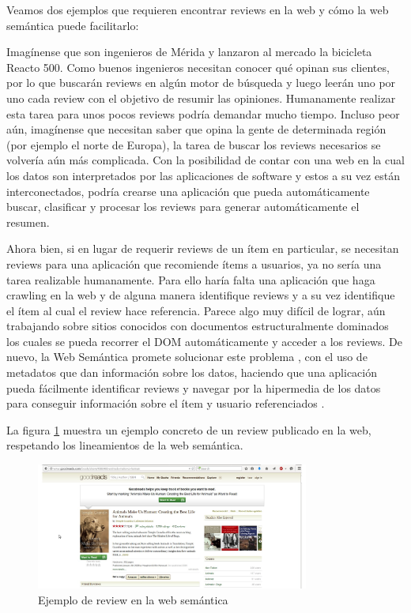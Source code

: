 Veamos dos ejemplos que requieren encontrar reviews en la web y cómo la web semántica puede facilitarlo:

Imagínense que son ingenieros de Mérida y lanzaron al mercado la bicicleta Reacto 500. Como buenos ingenieros necesitan conocer qué opinan sus clientes, por lo que buscarán reviews en algún motor de búsqueda y luego leerán uno por uno cada review con el objetivo de resumir las opiniones. Humanamente realizar esta tarea para unos pocos reviews podría demandar mucho tiempo. 
Incluso peor aún, imagínense que necesitan saber que opina la gente de determinada región (por ejemplo el norte de Europa), la tarea de buscar los reviews necesarios se volvería aún más complicada.
Con la posibilidad de contar con una web en la cual los datos son interpretados por las aplicaciones de software y estos a su vez están interconectados, podría crearse una aplicación que pueda automáticamente buscar, clasificar y procesar los reviews para generar automáticamente el resumen.

Ahora bien, si en lugar de requerir reviews de un ítem en particular, se necesitan reviews para una aplicación que recomiende ítems a usuarios, ya no sería una tarea realizable humanamente. Para ello haría falta una aplicación que haga crawling en la web y de alguna manera identifique reviews y a su vez identifique el ítem al cual el review hace referencia. 
Parece algo muy difícil de lograr, aún trabajando sobre sitios conocidos con documentos estructuralmente dominados los cuales se pueda recorrer el DOM automáticamente y acceder a los reviews.
De nuevo, la Web Semántica promete solucionar este problema \cite{Heitmann}, con el uso de metadatos que dan información sobre los datos, haciendo que una aplicación pueda fácilmente identificar reviews y navegar por la hipermedia de los datos para conseguir información sobre el ítem y usuario referenciados \cite{Zhou2005}.

La figura \ref{figure:semanticwebreview} muestra un ejemplo concreto de un review publicado en la web, respetando los lineamientos de la web semántica. 

\begin{figure}
    \centering
    \includegraphics[width=0.8\textwidth,natwidth=610,natheight=642]{semanticwebreview}
    \caption{Ejemplo de review en la web semántica}
    \label{figure:semanticwebreview}
\end{figure}

